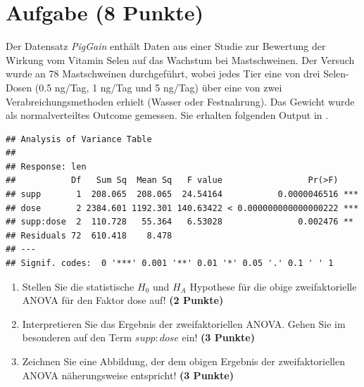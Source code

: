 \documentclass[a4paper, 10pt]{scrartcl}\usepackage[]{graphicx}\usepackage[]{xcolor}
\makeatletter
\newenvironment{kframe}{%
 \def\at@end@of@kframe{}%
 \ifinner\ifhmode%
  \def\at@end@of@kframe{\end{minipage}}%
  \begin{minipage}{\columnwidth}%
 \fi\fi%
 \def\FrameCommand##1{\hskip\@totalleftmargin \hskip-\fboxsep
 \colorbox{shadecolor}{##1}\hskip-\fboxsep
     \hskip-\linewidth \hskip-\@totalleftmargin \hskip\columnwidth}%
 \MakeFramed {\advance\hsize-\width
   \@totalleftmargin\z@ \linewidth\hsize
   \@setminipage}}%
 {\par\unskip\endMakeFramed%
 \at@end@of@kframe}
\newenvironment{knitrout}{}{} %
\makeatother
\begin{document}
 
\clearpage

\section{Aufgabe \hfill (8 Punkte)}



Der Datensatz \textit{PigGain} enth{\"a}lt Daten aus einer Studie zur Bewertung
der Wirkung vom Vitamin Selen auf das Wachstum bei Mastschweinen. Der Versuch
wurde an 78 Mastschweinen durchgef{\"u}hrt, wobei jedes Tier
eine von drei Selen-Dosen (0.5 ng/Tag, 1 ng/Tag und 5 ng/Tag) {\"u}ber eine von zwei
Verabreichungsmethoden erhielt (Wasser oder Festnahrung). Das Gewicht
wurde als normalverteiltes Outcome gemessen. Sie erhalten folgenden Output
in \Rlogo.

\begin{knitrout}
\color{fgcolor}\begin{kframe}
\begin{verbatim}
## Analysis of Variance Table
## 
## Response: len
##           Df   Sum Sq  Mean Sq   F value                 Pr(>F)    
## supp       1  208.065  208.065  24.54164           0.0000046516 ***
## dose       2 2384.601 1192.301 140.63422 < 0.000000000000000222 ***
## supp:dose  2  110.728   55.364   6.53028               0.002476 ** 
## Residuals 72  610.418    8.478                                     
## ---
## Signif. codes:  0 '***' 0.001 '**' 0.01 '*' 0.05 '.' 0.1 ' ' 1
\end{verbatim}
\end{kframe}
\end{knitrout}

\begin{enumerate}
\item Stellen Sie die statistische $H_0$ und $H_A$ Hypothese f{\"u}r die obige
  zweifaktorielle ANOVA f{\"u}r den Faktor dose
  auf! \textbf{(2 Punkte)}
\item Interpretieren Sie das Ergebnis der zweifaktoriellen ANOVA. Gehen Sie
  im besonderen auf den Term $supp:dose$ ein! \textbf{(3 Punkte)}
\item Zeichnen Sie eine Abbildung, der dem obigen Ergebnis der
  zweifaktoriellen ANOVA n{\"a}herungsweise entspricht! \textbf{(3 Punkte)}
\end{enumerate}
 
\clearpage
\end{document}
